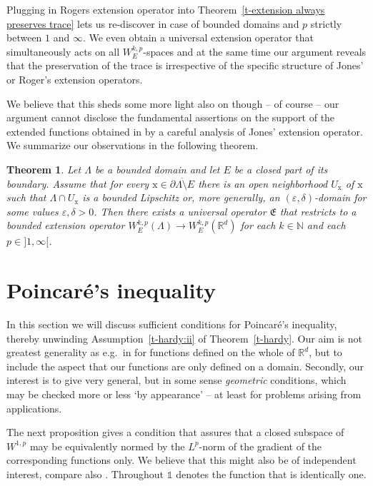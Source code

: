 \documentclass[10pt,leqno]{amsart}
\newtheorem{theorem}{Theorem}[section]
\theoremstyle{definition}
\numberwithin{equation}{section}
\begin{document}
Plugging in Rogers extension operator into Theorem~\ref{t-extension always
preserves trace} lets us re-discover \cite[Thm.~1.3]{mitrea}
in case of bounded domains and $p$ strictly between $1$ and $\infty$. We even
obtain a universal extension operator that simultaneously acts on all
$W_E^{k,p}$-spaces and at the same time our argument reveals that the
preservation of the trace is irrespective of the specific structure of
Jones' or Roger's extension operators. 

We believe that this sheds some more light also on \cite[Thm.~1.3]{mitrea}
though -- of course -- our argument cannot disclose the fundamental assertions
on the support of the extended functions obtained in \cite{mitrea} by a careful
analysis of Jones' extension operator. We summarize our observations in the
following theorem.

\begin{theorem} \label{t-rediscovering mitrea}
 Let $\Lambda$ be a bounded domain and let $E$ be a closed part of its boundary.
 Assume that for every ${{\mathrm x}} \in \overline{\partial \Lambda \setminus E}$ there
 is an open neighborhood $U_{{\mathrm x}}$ of $ {{\mathrm x}}$ such that $\Lambda \cap U_\mathrm
 x$ is a bounded Lipschitz or, more generally, an $({\varepsilon}, \delta)$-domain for
 some values ${\varepsilon}, \delta > 0$. Then there exists a universal operator
 $\mathfrak{E}$ that restricts to a bounded extension operator
 $W_E^{k,p}(\Lambda) \to W_E^{k,p}({{\mathbb R}}^d)$ for each $k \in {{\mathbb N}}$ and each $p \in
 {]1,\infty[}$.
\end{theorem}

\section{Poincar\'e's inequality}
\label{sec-poincare}
\noindent In this section we will discuss sufficient conditions for Poincar\'e's
inequality, thereby unwinding Assumption~\ref{t-hardy:ii} of
Theorem~\ref{t-hardy}. Our aim is not greatest generality as e.g.\
in \cite{mazsob} for functions defined on the whole of ${{\mathbb R}}^d$, but to include
the aspect that our functions are only defined on a domain. Secondly, our
interest is to give very general, but in some sense \emph{geometric} conditions,
which may be checked more or less `by appearance' -- at least for problems
arising from applications. 

The next proposition gives a condition that assures that a closed
subspace of $W^{1,p}$ may be equivalently normed by the $L^p$-norm of the
gradient of the corresponding functions only. We believe
that this might also be of independent interest, compare also
\cite[Ch.~4]{ziemer}. Throughout $\mathds 1$ denotes the function that is
identically one.
\end{document}
